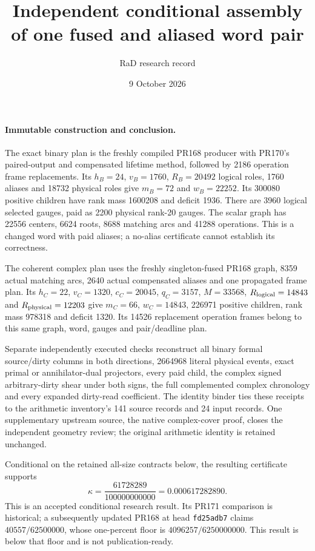 \documentclass[11pt]{article}
\title{Independent conditional assembly of one fused and aliased word pair}
\author{RaD research record}
\date{9 October 2026}
\begin{document}
\maketitle

\paragraph{Immutable construction and conclusion.}
The exact binary plan is the freshly compiled PR168 producer with PR170's
paired-output and compensated lifetime method, followed by 2186 operation
frame replacements. Its $h_B=24$, $v_B=1760$, $R_B=20492$ logical roles,
1760 aliases and 18732 physical roles give $m_B=72$ and $w_B=22252$.
Its 300080 positive children have rank mass 1600208 and deficit 1936.
There are 3960 logical selected gauges, paid as 2200 physical rank-20 gauges.
The scalar graph has 22556 centers, 6624 roots, 8688 matching arcs and
41288 operations. This is a changed word with paid aliases; a no-alias
certificate cannot establish its correctness.

The coherent complex plan uses the freshly singleton-fused PR168 graph,
8359 actual matching arcs, 2640 actual compensated aliases and one propagated
frame plan. Its $h_C=22$, $v_C=1320$, $c_C=20045$, $q_C=3157$,
$M=33568$, $R_{\rm logical}=14843$ and $R_{\rm physical}=12203$
give $m_C=66$, $w_C=14843$, 226971 positive children, rank mass 978318
and deficit 1320. Its 14526 replacement operation frames belong to
this same graph, word, gauges and pair/deadline plan.

Separate independently executed checks reconstruct all binary formal
source/dirty columns in both directions, 2664968 literal physical events,
exact primal or annihilator-dual projectors, every paid child, the complex
signed arbitrary-dirty shear under both signs, the full complemented
complex chronology and every expanded dirty-read coefficient.
The identity binder ties these receipts to the arithmetic inventory's
141 source records and 24 input records. One supplementary upstream source,
the native complex-cover proof, closes the independent geometry review;
the original arithmetic identity is retained unchanged.

Conditional on the retained all-size contracts below, the resulting
certificate supports
\[
 \kappa=\frac{61728289}{100000000000}=0.000617282890.
\]
This is an accepted conditional research result. Its PR171 comparison is
historical; a subsequently updated PR168 at head \texttt{fd25adb7}
claims $40557/62500000$, whose one-percent floor is
$4096257/6250000000$. This result is below
that floor and is not publication-ready.
\end{document}
